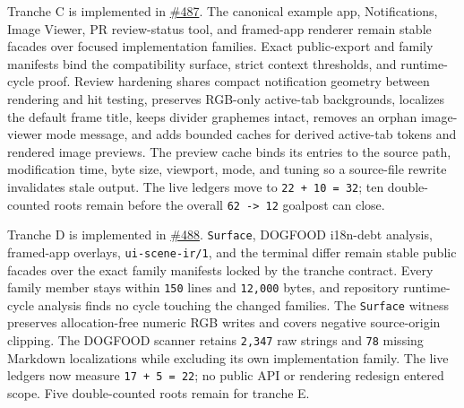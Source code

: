Tranche C is implemented in \href{https://github.com/flyingrobots/bijou/pull/487}{\#487}. The canonical example app, Notifications, Image Viewer, PR review-status tool, and framed-app renderer remain stable facades over focused implementation families. Exact public-export and family manifests bind the compatibility surface, strict context thresholds, and runtime-cycle proof. Review hardening shares compact notification geometry between rendering and hit testing, preserves RGB-only active-tab backgrounds, localizes the default frame title, keeps divider graphemes intact, removes an orphan image-viewer mode message, and adds bounded caches for derived active-tab tokens and rendered image previews. The preview cache binds its entries to the source path, modification time, byte size, viewport, mode, and tuning so a source-file rewrite invalidates stale output. The live ledgers move to \texttt{2\allowbreak{}2\allowbreak{} \allowbreak{}+\allowbreak{} \allowbreak{}1\allowbreak{}0\allowbreak{} \allowbreak{}=\allowbreak{} \allowbreak{}3\allowbreak{}2}; ten double-counted roots remain before the overall \texttt{6\allowbreak{}2\allowbreak{} \allowbreak{}-\allowbreak{}>\allowbreak{} \allowbreak{}1\allowbreak{}2} goalpost can close.

Tranche D is implemented in \href{https://github.com/flyingrobots/bijou/pull/488}{\#488}. \texttt{S\allowbreak{}u\allowbreak{}r\allowbreak{}f\allowbreak{}a\allowbreak{}c\allowbreak{}e}, DOGFOOD i18n-debt analysis, framed-app overlays, \texttt{u\allowbreak{}i\allowbreak{}-\allowbreak{}s\allowbreak{}c\allowbreak{}e\allowbreak{}n\allowbreak{}e\allowbreak{}-\allowbreak{}i\allowbreak{}r\allowbreak{}/\allowbreak{}1}, and the terminal differ remain stable public facades over the exact family manifests locked by the tranche contract. Every family member stays within \texttt{1\allowbreak{}5\allowbreak{}0} lines and \texttt{1\allowbreak{}2\allowbreak{},\allowbreak{}0\allowbreak{}0\allowbreak{}0} bytes, and repository runtime-cycle analysis finds no cycle touching the changed families. The \texttt{S\allowbreak{}u\allowbreak{}r\allowbreak{}f\allowbreak{}a\allowbreak{}c\allowbreak{}e} witness preserves allocation-free numeric RGB writes and covers negative source-origin clipping. The DOGFOOD scanner retains \texttt{2\allowbreak{},\allowbreak{}3\allowbreak{}4\allowbreak{}7} raw strings and \texttt{7\allowbreak{}8} missing Markdown localizations while excluding its own implementation family. The live ledgers now measure \texttt{1\allowbreak{}7\allowbreak{} \allowbreak{}+\allowbreak{} \allowbreak{}5\allowbreak{} \allowbreak{}=\allowbreak{} \allowbreak{}2\allowbreak{}2}; no public API or rendering redesign entered scope. Five double-counted roots remain for tranche E.

